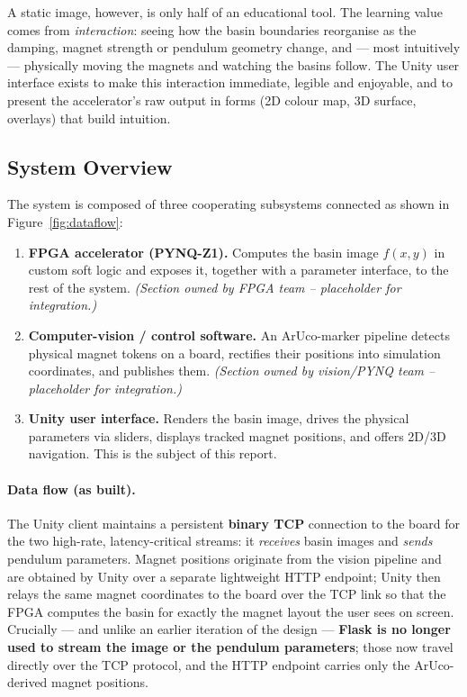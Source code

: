 \documentclass[11pt,a4paper]{article}
\newcommand{\owned}[1]{\textit{\small(Section owned by #1 -- placeholder for integration.)}}
\begin{document}
A static image, however, is only half of an educational tool. The learning
value comes from \emph{interaction}: seeing how the basin boundaries reorganise
as the damping, magnet strength or pendulum geometry change, and --- most
intuitively --- physically moving the magnets and watching the basins follow.
The Unity user interface exists to make this interaction immediate, legible and
enjoyable, and to present the accelerator's raw output in forms (2D colour map,
3D surface, overlays) that build intuition.

\subsection{System Overview}
\label{sec:system-overview}
The system is composed of three cooperating subsystems connected as shown in
Figure~\ref{fig:dataflow}:

\begin{enumerate}[noitemsep]
  \item \textbf{FPGA accelerator (PYNQ-Z1).} Computes the basin image
        $f(x,y)$ in custom soft logic and exposes it, together with a parameter
        interface, to the rest of the system. \owned{FPGA team}
  \item \textbf{Computer-vision / control software.} An ArUco-marker pipeline
        detects physical magnet tokens on a board, rectifies their positions
        into simulation coordinates, and publishes them. \owned{vision/PYNQ team}
  \item \textbf{Unity user interface.} Renders the basin image, drives the
        physical parameters via sliders, displays tracked magnet positions, and
        offers 2D/3D navigation. This is the subject of this report.
\end{enumerate}

\paragraph{Data flow (as built).}
The Unity client maintains a persistent \textbf{binary TCP} connection to the
board for the two high-rate, latency-critical streams: it \emph{receives} basin
images and \emph{sends} pendulum parameters. Magnet positions originate from the
vision pipeline and are obtained by Unity over a separate lightweight HTTP
endpoint; Unity then relays the same magnet coordinates to the board over the
TCP link so that the FPGA computes the basin for exactly the magnet layout the
user sees on screen. Crucially --- and unlike an earlier iteration of the design
--- \textbf{Flask is no longer used to stream the image or the pendulum
parameters}; those now travel directly over the TCP protocol, and the HTTP
endpoint carries only the ArUco-derived magnet positions.
\end{document}
